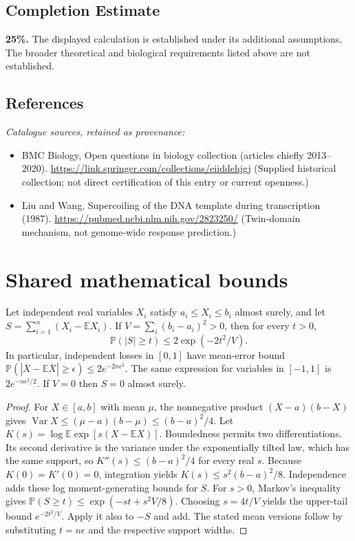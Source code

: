 \documentclass[11pt]{article}
\begin{document}
\subsection{Completion Estimate}
\textbf{25\%.} The displayed calculation is established under its additional assumptions. The broader theoretical and biological requirements listed above are not established.
\subsection{References}
\noindent\emph{Catalogue sources, retained as provenance:}
\begin{itemize}
\item BMC Biology, Open questions in biology collection (articles chiefly 2013--2020). \url{https://link.springer.com/collections/eiiddehjgj} (Supplied historical collection; not direct certification of this entry or current openness.)
\item Liu and Wang, Supercoiling of the DNA template during transcription (1987). \url{https://pubmed.ncbi.nlm.nih.gov/2823250/} (Twin-domain mechanism, not genome-wide response prediction.)
\end{itemize}




\section{Shared mathematical bounds}\label{app:bounds}
\begin{lemma}\label{lem:bounded}
Let independent real variables $X_i$ satisfy $a_i\leq X_i\leq b_i$ almost surely,
and let $S=\sum_{i=1}^n(X_i-\mathbb{E} X_i)$. If
$V=\sum_i(b_i-a_i)^2>0$, then for every $t>0$,
\[
 \mathbb{P}(|S|\geq t)\leq 2\exp(-2t^2/V).
\]
In particular, independent losses in $[0,1]$ have mean-error bound
$\mathbb{P}(|\overline X-\mathbb{E}\overline X|\geq\epsilon)
\leq2e^{-2n\epsilon^2}$. The same expression for variables in $[-1,1]$
is $2e^{-n\epsilon^2/2}$. If $V=0$ then $S=0$ almost surely.
\end{lemma}
\begin{proof}
For $X\in[a,b]$ with mean $\mu$, the nonnegative product
$(X-a)(b-X)$ gives
$\operatorname{Var} X\leq(\mu-a)(b-\mu)\leq(b-a)^2/4$.
Let $K(s)=\log\mathbb{E}\exp[s(X-\mathbb{E} X)]$.
Boundedness permits two differentiations. Its second derivative is the variance
under the exponentially tilted law, which has the same support, so
$K''(s)\leq(b-a)^2/4$ for every real $s$.
Because $K(0)=K'(0)=0$, integration yields
$K(s)\leq s^2(b-a)^2/8$.
Independence adds these log moment-generating bounds for $S$.
For $s>0$, Markov's inequality gives
$\mathbb{P}(S\geq t)\leq\exp(-st+s^2V/8)$.
Choosing $s=4t/V$ yields the upper-tail bound $e^{-2t^2/V}$.
Apply it also to $-S$ and add. The stated mean versions follow by substituting
$t=n\epsilon$ and the respective support widths.
\end{proof}
\end{document}
